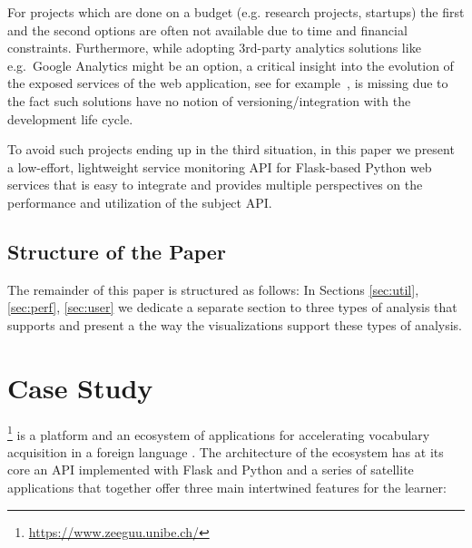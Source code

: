 \documentclass[conference]{IEEEtran}
\begin{document}

For projects which are done on a budget (e.g. research projects, startups) the first and the second options are often not available due to time and financial constraints. Furthermore, while adopting 3rd-party analytics solutions like e.g.~Google Analytics might be an option, a critical insight into the evolution of the exposed services of the web application, see for example~\cite{papazoglou2011managing}, is missing due to the fact such solutions have no notion of versioning/integration with the development life cycle.

To avoid such projects ending up in the third situation, in this paper we present a low-effort, lightweight service monitoring API for Flask-based Python web services that is easy to integrate and provides multiple perspectives on the performance and utilization of the subject API.

  \subsection* {Structure of the Paper}
    
    The remainder of this paper is structured as follows: In Sections \ref{sec:util}, \ref{sec:perf}, \ref{sec:user} we dedicate a separate section to three types of analysis that \tool supports and present a the way the visualizations support these types of analysis. 



\section{Case Study}

  
  \zee\footnote{\url{https://www.zeeguu.unibe.ch/}} is a platform and an ecosystem of applications for accelerating vocabulary acquisition in a foreign language \cite{Lungu16}. 
%
  The architecture of the ecosystem has at its core an API implemented with Flask and Python and a series of satellite applications that together offer three main intertwined features for the learner:
\end{document}
